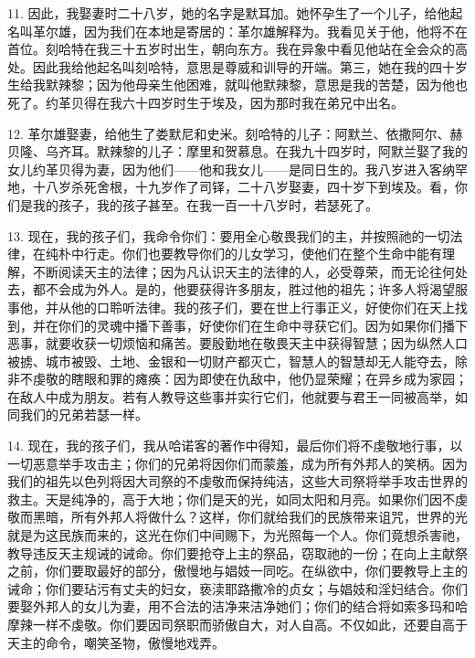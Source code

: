 11. 因此，我娶妻时二十八岁，她的名字是默耳加。她怀孕生了一个儿子，给他起名叫革尔雄，因为我们在本地是寄居的：革尔雄解释为。我看见关于他，他将不在首位。刻哈特在我三十五岁时出生，朝向东方。我在异象中看见他站在全会众的高处。因此我给他起名叫刻哈特，意思是尊威和训导的开端。第三，她在我的四十岁生给我默辣黎；因为他母亲生他困难，就叫他默辣黎，意思是我的苦楚，因为他也死了。约革贝得在我六十四岁时生于埃及，因为那时我在弟兄中出名。\par

12. 革尔雄娶妻，给他生了娄默尼和史米。刻哈特的儿子：阿默兰、依撒阿尔、赫贝隆、乌齐耳。默辣黎的儿子：摩里和贺慕息。在我九十四岁时，阿默兰娶了我的女儿约革贝得为妻，因为他们——他和我女儿——是同日生的。我八岁进入客纳罕地，十八岁杀死舍根，十九岁作了司铎，二十八岁娶妻，四十岁下到埃及。看，你们是我的孩子，我的孩子甚至。在我一百一十八岁时，若瑟死了。\par

13. 现在，我的孩子们，我命令你们：要用全心敬畏我们的主，并按照祂的一切法律，在纯朴中行走。你们也要教导你们的儿女学习，使他们在整个生命中能有理解，不断阅读天主的法律；因为凡认识天主的法律的人，必受尊荣，而无论往何处去，都不会成为外人。是的，他要获得许多朋友，胜过他的祖先；许多人将渴望服事他，并从他的口聆听法律。我的孩子们，要在世上行事正义，好使你们在天上找到，并在你们的灵魂中播下善事，好使你们在生命中寻获它们。因为如果你们播下恶事，就要收获一切烦恼和痛苦。要殷勤地在敬畏天主中获得智慧；因为纵然人口被掳、城市被毁、土地、金银和一切财产都灭亡，智慧人的智慧却无人能夺去，除非不虔敬的瞎眼和罪的瘫痪：因为即使在仇敌中，他仍显荣耀；在异乡成为家园；在敌人中成为朋友。若有人教导这些事并实行它们，他就要与君王一同被高举，如同我们的兄弟若瑟一样。\par

14. 现在，我的孩子们，我从哈诺客的著作中得知，最后你们将不虔敬地行事，以一切恶意举手攻击主；你们的兄弟将因你们而蒙羞，成为所有外邦人的笑柄。因为我们的祖先以色列将因大司祭的不虔敬而保持纯洁，这些大司祭将举手攻击世界的救主。天是纯净的，高于大地；你们是天的光，如同太阳和月亮。如果你们因不虔敬而黑暗，所有外邦人将做什么？这样，你们就给我们的民族带来诅咒，世界的光就是为这民族而来的，这光在你们中间赐下，为光照每一个人。你们竟想杀害祂，教导违反天主规诫的诫命。你们要抢夺上主的祭品，窃取祂的一份；在向上主献祭之前，你们要取最好的部分，傲慢地与娼妓一同吃。在纵欲中，你们要教导上主的诫命；你们要玷污有丈夫的妇女，亵渎耶路撒冷的贞女；与娼妓和淫妇结合。你们要娶外邦人的女儿为妻，用不合法的洁净来洁净她们；你们的结合将如索多玛和哈摩辣一样不虔敬。你们要因司祭职而骄傲自大，对人自高。不仅如此，还要自高于天主的命令，嘲笑圣物，傲慢地戏弄。\par

